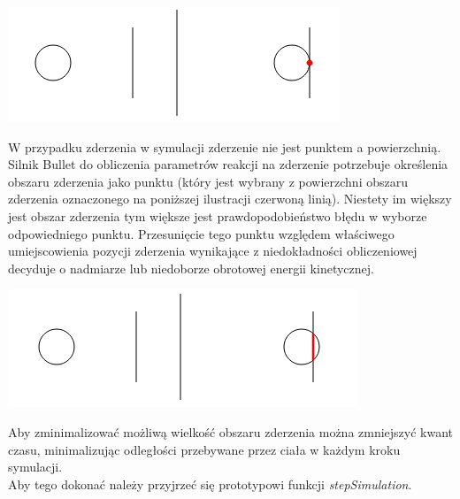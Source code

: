 \begin{center}
\includegraphics{./img/zderzenie1.png}
\end{center}

W przypadku zderzenia w symulacji zderzenie nie jest punktem a powierzchnią.
Silnik Bullet do obliczenia parametrów reakcji na zderzenie potrzebuje
określenia obszaru zderzenia jako punktu (który jest wybrany z powierzchni
obszaru zderzenia oznaczonego na poniższej ilustracji czerwoną linią). Niestety
im większy jest obszar zderzenia tym większe jest prawdopodobieństwo błędu w
wyborze odpowiedniego punktu. Przesunięcie tego punktu względem właściwego
umiejscowienia pozycji zderzenia wynikające z niedokładności obliczeniowej
decyduje o nadmiarze lub niedoborze obrotowej energii kinetycznej.

\begin{center}
\includegraphics{./img/zderzenie2.png}
\end{center}

Aby zminimalizować możliwą wielkość obszaru zderzenia można zmniejszyć kwant
czasu, minimalizując odległości przebywane przez ciała w każdym kroku
symulacji.\\
Aby tego dokonać należy przyjrzeć się prototypowi funkcji \emph{stepSimulation}.



